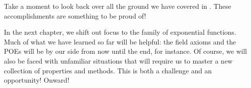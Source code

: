Take a moment to look back over all the ground we have covered in . These accomplishments are something to be proud of!

In the next chapter, we shift out focus to the family of exponential functions. Much of what we have learned so far will be helpful: the field axioms and the POEs will be by our side from now until the end, for instance. Of course, we will also be faced with unfamiliar situations that will require us to master a new collection of properties and methods. This is both a challenge and an opportunity! Onward!
